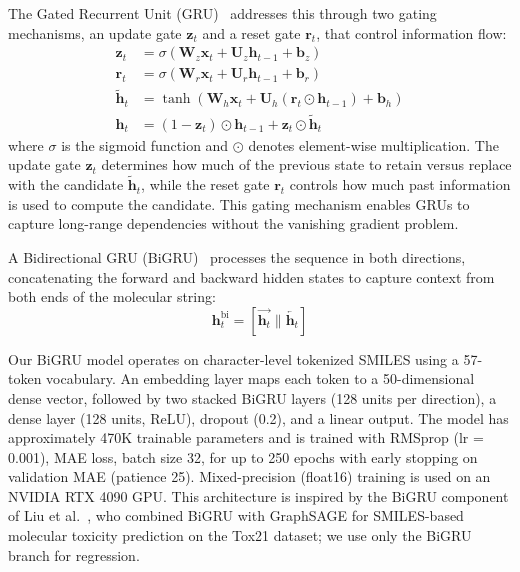 \documentclass[11pt,a4paper]{article}
\newcommand{\vect}[1]{\mathbf{#1}}
\newcommand{\matr}[1]{\mathbf{#1}}
\begin{document}
The Gated Recurrent Unit (GRU)~\cite{cho2014learning} addresses this through two gating mechanisms, an update gate $\vect{z}_t$ and a reset gate $\vect{r}_t$, that control information flow:
\begin{align}
    \vect{z}_t &= \sigma(\matr{W}_z \vect{x}_t + \matr{U}_z \vect{h}_{t-1} + \vect{b}_z) \label{eq:gru_update} \\
    \vect{r}_t &= \sigma(\matr{W}_r \vect{x}_t + \matr{U}_r \vect{h}_{t-1} + \vect{b}_r) \label{eq:gru_reset} \\
    \tilde{\vect{h}}_t &= \tanh(\matr{W}_h \vect{x}_t + \matr{U}_h (\vect{r}_t \odot \vect{h}_{t-1}) + \vect{b}_h) \label{eq:gru_candidate} \\
    \vect{h}_t &= (1 - \vect{z}_t) \odot \vect{h}_{t-1} + \vect{z}_t \odot \tilde{\vect{h}}_t \label{eq:gru_output}
\end{align}
where $\sigma$ is the sigmoid function and $\odot$ denotes element-wise multiplication.
The update gate $\vect{z}_t$ determines how much of the previous state to retain versus replace with the candidate $\tilde{\vect{h}}_t$, while the reset gate $\vect{r}_t$ controls how much past information is used to compute the candidate.
This gating mechanism enables GRUs to capture long-range dependencies without the vanishing gradient problem.

A Bidirectional GRU (BiGRU)~\cite{schuster1997bidirectional} processes the sequence in both directions, concatenating the forward and backward hidden states to capture context from both ends of the molecular string:
\begin{equation}
    \vect{h}_t^{\text{bi}} = [\overrightarrow{\vect{h}_t} \| \overleftarrow{\vect{h}_t}]
\end{equation}

Our BiGRU model operates on character-level tokenized SMILES using a 57-token vocabulary.
An embedding layer maps each token to a 50-dimensional dense vector, followed by two stacked BiGRU layers (128 units per direction), a dense layer (128 units, ReLU), dropout (0.2), and a linear output.
The model has approximately 470K trainable parameters and is trained with RMSprop (lr = 0.001), MAE loss, batch size 32, for up to 250 epochs with early stopping on validation MAE (patience 25).
Mixed-precision (float16) training is used on an NVIDIA RTX 4090 GPU.
This architecture is inspired by the BiGRU component of Liu et al.~\cite{liuPredictionMolecularToxicity2023}, who combined BiGRU with GraphSAGE for SMILES-based molecular toxicity prediction on the Tox21 dataset; we use only the BiGRU branch for regression.
\end{document}
